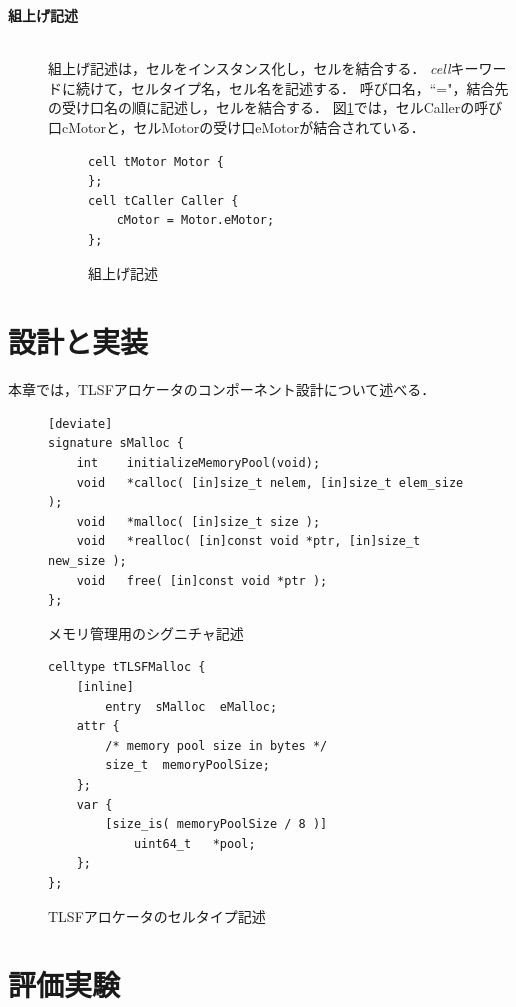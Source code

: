 \documentclass[submit]{ipsj_v2/UTF8/ipsj}
\begin{document}
\begin{description}
    \item[{\bf 組上げ記述}]\mbox{}\\
        組上げ記述は，セルをインスタンス化し，セルを結合する．
        {\it cell}キーワードに続けて，セルタイプ名，セル名を記述する．
        呼び口名，``="，結合先の受け口名の順に記述し，セルを結合する．
        図\ref{build}では，セルCallerの呼び口cMotorと，セルMotorの受け口eMotorが結合されている．
        
\begin{figure}[t]
\centering
\begin{lstlisting}
cell tMotor Motor {
};
cell tCaller Caller {
    cMotor = Motor.eMotor;
};
\end{lstlisting}
\caption{組上げ記述}
\label{build}
\end{figure}

\end{description}

\section{設計と実装}
\label{sec:Design and Implementation}
本章では，TLSFアロケータのコンポーネント設計について述べる．

\begin{figure}[t]
\centering
\begin{lstlisting}
[deviate]
signature sMalloc {
    int    initializeMemoryPool(void);
    void   *calloc( [in]size_t nelem, [in]size_t elem_size );
    void   *malloc( [in]size_t size );
    void   *realloc( [in]const void *ptr, [in]size_t new_size );
    void   free( [in]const void *ptr );
};
\end{lstlisting}
\caption{メモリ管理用のシグニチャ記述}  
\label{src:TLSFSignature}
\end{figure}

\begin{figure}[t]
\centering
\begin{lstlisting}
celltype tTLSFMalloc {
    [inline]
        entry  sMalloc  eMalloc;
    attr {
        /* memory pool size in bytes */
        size_t  memoryPoolSize;
    };
    var {
        [size_is( memoryPoolSize / 8 )]
            uint64_t   *pool;
    };
};
\end{lstlisting}
\caption{TLSFアロケータのセルタイプ記述}  
\label{src:TLSFCelltype}
\end{figure}

\section{評価実験}
\label{sec:Evaluation}
\end{document}
